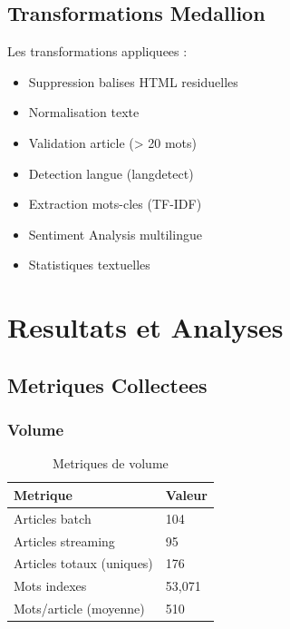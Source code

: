 \documentclass[12pt,a4paper]{report}
\begin{document}
\section{Transformations Medallion}

Les transformations appliquees :

\begin{itemize}
    \item Suppression balises HTML residuelles
    \item Normalisation texte
    \item Validation article (> 20 mots)
    \item Detection langue (langdetect)
    \item Extraction mots-cles (TF-IDF)
    \item Sentiment Analysis multilingue
    \item Statistiques textuelles
\end{itemize}


\chapter{Resultats et Analyses}

\section{Metriques Collectees}

\subsection{Volume}

\begin{table}[H]
\centering
\begin{tabular}{ll}
\toprule
\textbf{Metrique} & \textbf{Valeur} \\
\midrule
Articles batch & 104 \\
Articles streaming & 95 \\
Articles totaux (uniques) & 176 \\
Mots indexes & 53,071 \\
Mots/article (moyenne) & 510 \\
\bottomrule
\end{tabular}
\caption{Metriques de volume}
\end{table}
\end{document}
